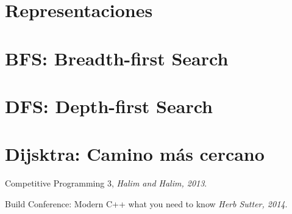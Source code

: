 \documentclass[12pt, fleqn]{report}                             %
\theoremstyle{break}                                            %
\begin{document}
        \section{Representaciones}

        \section{BFS: Breadth-first Search}


        \section{DFS: Depth-first Search}

        \section{Dijsktra: Camino más cercano}



\begin{thebibliography}{10}

        Competitive Programming 3,
        \textit{Halim and Halim, 2013}. 


        Build Conference: Modern C++ what you need to know
        \textit{Herb Sutter, 2014}. 

\end{thebibliography}
\end{document}
